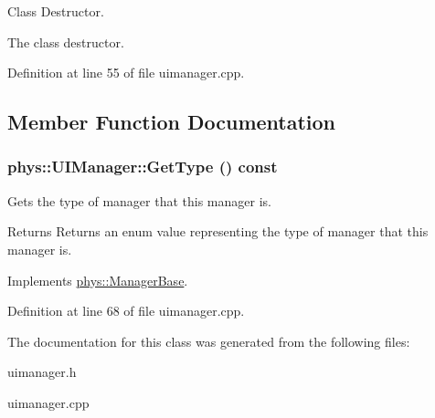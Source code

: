 Class Destructor. 

The class destructor. 

Definition at line 55 of file uimanager.cpp.



\subsection{Member Function Documentation}
\hypertarget{classphys_1_1UIManager_ab8fe74564ca5dc09cbe4b1cc2c007e79}{
\subsubsection[{GetType}]{ phys::UIManager::GetType () const}}
\label{d5/dc5/classphys_1_1UIManager_ab8fe74564ca5dc09cbe4b1cc2c007e79}


Gets the type of manager that this manager is. 

\begin{DoxyReturn}{Returns}
Returns an enum value representing the type of manager that this manager is. 
\end{DoxyReturn}


Implements \hyperlink{classphys_1_1ManagerBase_aff400b6599db635e24796d8221e9a0e3}{phys::ManagerBase}.



Definition at line 68 of file uimanager.cpp.



The documentation for this class was generated from the following files:\begin{DoxyCompactItemize}
\item 
uimanager.h\item 
uimanager.cpp\end{DoxyCompactItemize}
